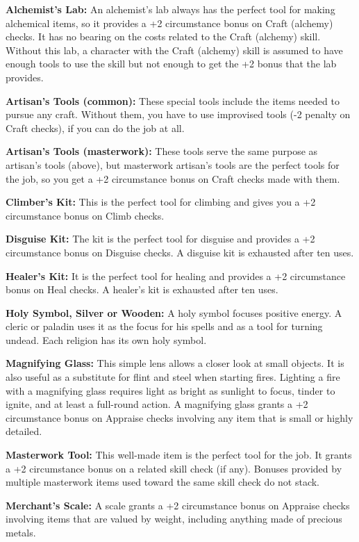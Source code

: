\textbf{Alchemist's Lab:} An alchemist's lab always has the perfect tool for making 
alchemical items, so it provides a +2 circumstance bonus on Craft (alchemy) checks. 
It has no bearing on the costs related to the Craft (alchemy) skill. Without this 
lab, a character with the Craft (alchemy) skill is assumed to have enough tools 
to use the skill but not enough to get the +2 bonus that the lab provides.

\textbf{Artisan's Tools (common):} These special tools include the items needed to pursue 
any craft. Without them, you have to use improvised tools (-2 penalty on Craft 
checks), if you can do the job at all.

\textbf{Artisan's Tools (masterwork):} These tools serve the same purpose as artisan's 
tools (above), but masterwork artisan's tools are the perfect tools for the job, 
so you get a +2 circumstance bonus on Craft checks made with them.

\textbf{Climber's Kit:} This is the perfect tool for climbing and gives you a +2 
circumstance bonus on Climb checks.

\textbf{Disguise Kit:} The kit is the perfect tool for disguise and provides a 
+2 circumstance bonus on Disguise checks. A disguise kit is exhausted after ten 
uses.

\textbf{Healer's Kit:} It is the perfect tool for healing and provides a +2 circumstance 
bonus on Heal checks. A healer's kit is exhausted after ten uses.

\textbf{Holy Symbol, Silver or Wooden:} A holy symbol focuses positive energy. 
A cleric or paladin uses it as the focus for his spells and as a tool for turning 
undead. Each religion has its own holy symbol.

\textbf{Magnifying Glass:} This simple lens allows a closer look at small objects. 
It is also useful as a substitute for flint and steel when starting fires. Lighting 
a fire with a magnifying glass requires light as bright as sunlight to focus, tinder 
to ignite, and at least a full-round action. A magnifying glass grants a +2 circumstance 
bonus on Appraise checks involving any item that is small or highly detailed.

\textbf{Masterwork Tool:} This well-made item is the perfect tool for the job. 
It grants a +2 circumstance bonus on a related skill check (if any). Bonuses provided 
by multiple masterwork items used toward the same skill check do not stack.

\textbf{Merchant's Scale:} A scale grants a +2 circumstance bonus on Appraise 
checks involving items that are valued by weight, including anything made of precious 
metals.

